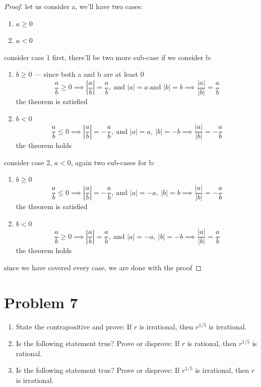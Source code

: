  \begin{proof}
  let us consider a, we'll have two cases:
  \begin{enumerate}
      \item $a \ge 0$
      \item $a < 0$
  \end{enumerate}
  consider case 1 first, there'll be two more sub-case if we consider
  b:
  \begin{enumerate}
      \item[$1.1$] $b \ge 0$ --- since both a and b are at least 0
      \[
          \frac{a}{b} \ge 0 \implies \left|\frac{a}{b}\right| = \frac{a}{b},\
  \text{and } |a| = a\ \text{and } |b| = b \implies \frac{|a|}{|b|} =
  \frac{a}{b}
      \]
      the theorem is satisfied
      \item[$1.2$] $b < 0$
      \[
      \frac{a}{b} \le 0 \implies \left|\frac{a}{b}\right| = -\frac{a}{b},\
  \text{and } |a| = a,\ |b| = -b \implies \frac{|a|}{|b|} = -\frac{a}
  {b}
      \]
      the theorem holds
  \end{enumerate}
  consider case 2, $a < 0$, again two sub-cases for b:
  \begin{enumerate}
      \item[$2.1$] $b \ge 0$
      \[
          \frac{a}{b} \le 0 \implies \left|\frac{a}{b}\right| = -\frac{a}{b},\
  \text{and } |a| = -a,\ |b| = b \implies \frac{|a|}{|b|} = -\frac{a}
  {b}
      \]
      the theorem is satisfied
      \item[$2.2$] $b < 0$
      \[
          \frac{a}{b} \ge 0 \implies \left|\frac{a}{b}\right| = \frac{a}{b},\
  \text{and } |a| = -a,\ |b| = -b \implies \frac{|a|}{|b|} = \frac{a}
  {b}
      \]
      the theorem holds
  \end{enumerate}
  since we have covered every case, we are done with the proof
  \end{proof}



\vspace{1em}
\hrulefill


\section*{Problem 7}
\begin{enumerate}[label=\arabic*.]
    \item State the contrapositive and prove: If $r$ is irrational, then $r^{1/5}$ is irrational.
    \item Is the following statement true? Prove or disprove: If $r$ is rational, then $r^{1/5}$ is rational.
    \item Is the following statement true? Prove or disprove: If $r^{1/5}$ is irrational, then $r$ is irrational.
\end{enumerate}

